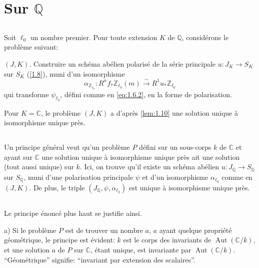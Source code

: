 \documentclass[10pt,leqno]{amsart}
\theoremstyle{plain}
\theoremstyle{definition}
\theoremstyle{remark}
\DeclareMathOperator{\Aut}{Aut}
\newcommand{\ZZ}{\mathbb{Z}}
\newcommand{\QQ}{\mathbb{Q}}
\newcommand{\CC}{\mathbb{C}}
\begin{document}
\section{Sur $\QQ$}

\subsection{}\label{2.1}

Soit $\ell_0$ un nombre premier. Pour toute extension $K$ de $\QQ$, consid\'erons le probl\`eme suivant:

\smallskip

$(J,K)$. Construire un sch\'ema ab\'elien polaris\'e de la s\'erie principale $u\colon J_K\to S_K$ sur $S_K$ (\ref{1.8}), muni d'un isomorphisme
\[
\alpha_{\ZZ_{\ell_0}}\colon R^nf_*\ZZ_{\ell_0}(m)\xrightarrow{\sim}R^1u_*\ZZ_{\ell_0}
\]
qui transforme $\psi_{\ell_0}$, d\'efini comme en \eqref{eq:1.6.2}, en la forme de polarisation.

\smallskip

Pour $K=\CC$, le probl\`eme $(J,K)$ a d'apr\`es \ref{lem:1.10} une solution unique \`a isomorphisme unique pr\`es.

\subsection{}\label{2.2}

Un principe g\'en\'eral veut qu'un probl\`eme $P$ d\'efini sur un sous-corps $k$ de $\CC$ et ayant sur $\CC$ une solution unique \`a isomorphisme unique pr\`es ait une solution (tout aussi unique) sur $k$. Ici, on trouve qu'il existe un sch\'ema ab\'elien $u\colon J_\QQ\to S_\QQ$ sur $S_\QQ$, muni d'une polarisation principale $\psi$ et d'un isomorphisme $\alpha_{\ell_0}$ comme en $(J,K)$. De plus, le triple $(J_\QQ,\psi,\alpha_{\ell_0})$ est unique \`a isomorphisme unique pr\`es.

\subsection{}\label{2.3}

Le principe \'enonc\'e plus haut se justifie ainsi.

a) Si le probl\`eme $P$ est de trouver un nombre $a$, $a$ ayant quelque propri\'et\'e g\'eom\'etrique, le principe est \'evident: $k$ est le corps des invariants de $\Aut(\CC/k)$, et une solution $a$ de $P$ sur $\CC$, \'etant unique, est invariante par $\Aut(\CC/k)$. ``G\'eom\'etrique'' signifie: ``invariant par extension des scalaires''.
\end{document}
